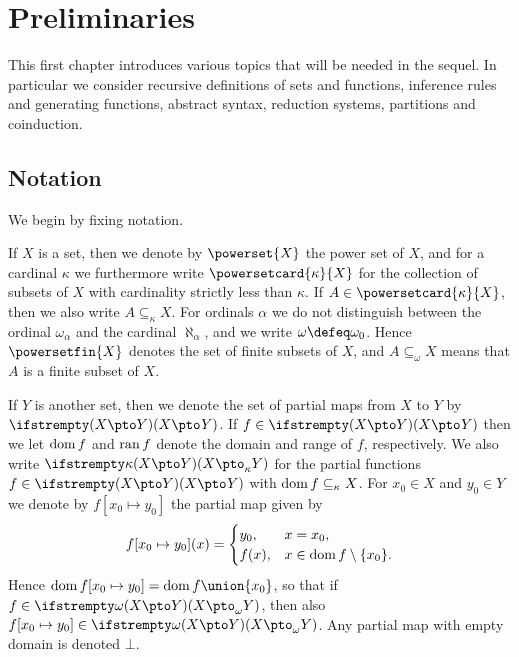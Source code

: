 \chapter{Preliminaries}\label{chap:preliminaries}

This first chapter introduces various topics that will be needed in the sequel. In particular we consider recursive definitions of sets and functions, inference rules and generating functions, abstract syntax, reduction systems, partitions and coinduction.

\section{Notation}

We begin by fixing notation.

If $X$ is a set, then we denote by $\powerset{X}$ the power set of $X$, and for a cardinal $\kappa$ we furthermore write $\powersetcard{\kappa}{X}$ for the collection of subsets of $X$ with cardinality strictly less than $\kappa$. If $A \in \powersetcard{\kappa}{X}$, then we also write $A \subseteq_\kappa X$. For ordinals $\alpha$ we do not distinguish between the ordinal $\omega_\alpha$ and the cardinal $\aleph_\alpha$, and we write $\omega \defeq \omega_0$. Hence $\powersetfin{X}$ denotes the set of finite subsets of $X$, and $A \subseteq_\omega X$ means that $A$ is a finite subset of $X$.

If $Y$ is another set, then we denote the set of partial maps from $X$ to $Y$ by $\pmaps{X}{Y}$. If $f \in \pmaps{X}{Y}$ then we let $\operatorname{dom} f$ and $\operatorname{ran} f$ denote the domain and range of $f$, respectively. We also write $\pmaps[\kappa]{X}{Y}$ for the partial functions $f \in \pmaps{X}{Y}$ with $\operatorname{dom} f \subseteq_\kappa X$. For $x_0 \in X$ and $y_0 \in Y$ we denote by $f[x_0 \mapsto y_0]$ the partial map given by
%
\begin{equation*}
    f[x_0 \mapsto y_0](x) =
    \begin{cases}
        y_0, & x = x_0, \\
        f(x), & x \in \operatorname{dom} f \setminus \{x_0\}.
    \end{cases}
\end{equation*}
%
Hence $\dom f[x_0 \mapsto y_0] = \dom f \union \{x_0\}$, so that if $f \in \pmapsfin{X}{Y}$, then also $f[x_0 \mapsto y_0] \in \pmapsfin{X}{Y}$. Any partial map with empty domain is denoted $\bot$.

